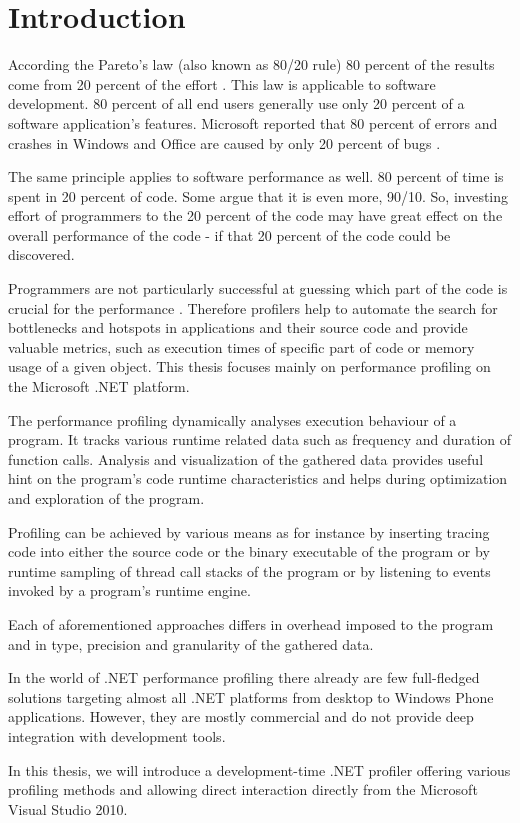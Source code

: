 \chapter{Introduction}

According the Pareto's law (also known as 80/20 rule) 80 percent of the results come from 20 percent of the effort \cite{RicKoch1999}. This law is applicable to software development. 80 percent of all end users generally use only 20 percent of a software application's features. Microsoft reported that 80 percent of errors and crashes in Windows and Office are caused by only 20 percent of bugs \cite{PauRoon2002}.

The same principle applies to software performance as well. 80 percent of time is spent in 20 percent of code. Some argue that it is even more, 90/10. So, investing effort of programmers to the 20 percent of the code may have great effect on the overall performance of the code - if that 20 percent of the code could be discovered.

Programmers are not particularly successful at guessing which part of the code is crucial for the performance \cite{SteMcCo2004}. Therefore profilers help to automate the search for bottlenecks and hotspots in applications and their source code and provide valuable metrics, such as execution times of specific part of code or memory usage of a given object. This thesis focuses mainly on performance profiling on the Microsoft .NET platform.

The performance profiling dynamically analyses execution behaviour of a program. It tracks various runtime related data such as frequency and duration of function calls. Analysis and visualization of the gathered data provides useful hint on the program's code runtime characteristics and helps during optimization and exploration of the program.
	
Profiling can be achieved by various means as for instance by inserting tracing code into either the source code or the binary executable of the program or by runtime sampling of thread call stacks of the program or by listening to events invoked by a program's runtime engine.

Each of aforementioned approaches differs in overhead imposed to the program and in type, precision and granularity of the gathered data.

In the world of .NET performance profiling there already are few full-fledged solutions targeting almost all .NET platforms from desktop to Windows Phone applications. However, they are mostly commercial and do not provide deep integration with development tools.  

In this thesis, we will introduce a development-time .NET profiler offering various profiling methods and allowing direct interaction directly from the Microsoft Visual Studio 2010.